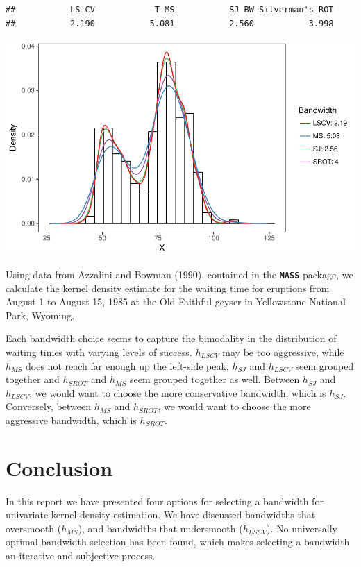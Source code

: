 \documentclass[]{article}
\begin{document}
\begin{verbatim}
##           LS CV            T MS           SJ BW Silverman's ROT 
##           2.190           5.081           2.560           3.998
\end{verbatim}

\begin{center}\includegraphics{FinalReport_files/figure-latex/unnamed-chunk-9-1} \end{center}

Using data from Azzalini and Bowman (1990), contained in the
\textbf{\texttt{MASS}} package, we calculate the kernel density estimate
for the waiting time for eruptions from August 1 to August 15, 1985 at
the Old Faithful geyser in Yellowstone National Park, Wyoming.

Each bandwidth choice seems to capture the bimodality in the
distribution of waiting times with varying levels of success.
\(h_{LSCV}\) may be too aggressive, while \(h_{MS}\) does not reach far
enough up the left-side peak. \(h_{SJ}\) and \(h_{LSCV}\) seem grouped
together and \(h_{SROT}\) and \(h_{MS}\) seem grouped together as well.
Between \(h_{SJ}\) and \(h_{LSCV}\), we would want to choose the more
conservative bandwidth, which is \(h_{SJ}\). Conversely, between
\(h_{MS}\) and \(h_{SROT}\), we would want to choose the more aggressive
bandwidth, which is \(h_{SROT}\).

\section{Conclusion}\label{conclusion}

In this report we have presented four options for selecting a bandwidth
for univariate kernel density estimation. We have discussed bandwidths
that oversmooth (\(h_{MS}\)), and bandwidths that undersmooth
(\(h_{LSCV}\)). No universally optimal bandwidth selection has been
found, which makes selecting a bandwidth an iterative and subjective
process.
\end{document}
